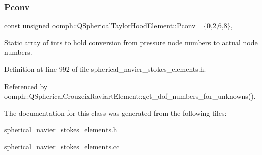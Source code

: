 \mbox{\label{classoomph_1_1QSphericalTaylorHoodElement_af1726837de58e680ce2629e4281e4432}} 
\subsubsection{\texorpdfstring{Pconv}{Pconv}}
{\footnotesize\ttfamily const unsigned oomph\+::\+Q\+Spherical\+Taylor\+Hood\+Element\+::\+Pconv =\{0,2,6,8\}\hspace{0.3cm}{\ttfamily [static]}, {\ttfamily [protected]}}



Static array of ints to hold conversion from pressure node numbers to actual node numbers. 



Definition at line 992 of file spherical\+\_\+navier\+\_\+stokes\+\_\+elements.\+h.



Referenced by oomph\+::\+Q\+Spherical\+Crouzeix\+Raviart\+Element\+::get\+\_\+dof\+\_\+numbers\+\_\+for\+\_\+unknowns().



The documentation for this class was generated from the following files\+:\begin{DoxyCompactItemize}
\item 
\hyperlink{spherical__navier__stokes__elements_8h}{spherical\+\_\+navier\+\_\+stokes\+\_\+elements.\+h}\item 
\hyperlink{spherical__navier__stokes__elements_8cc}{spherical\+\_\+navier\+\_\+stokes\+\_\+elements.\+cc}\end{DoxyCompactItemize}
